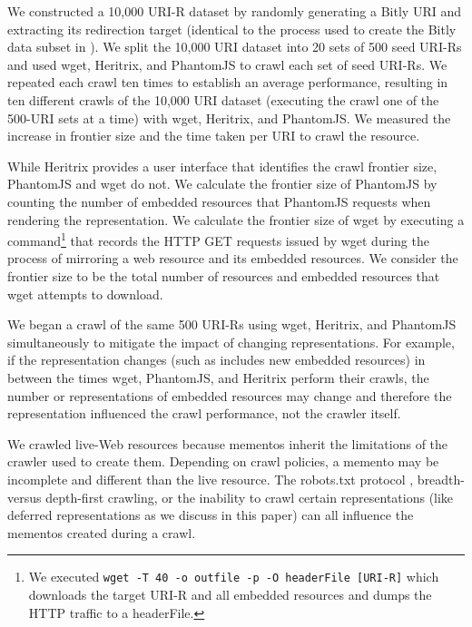 \documentclass{ipres_proc_article-sp}
\begin{document}
We constructed a 10,000 URI-R dataset by randomly generating a Bitly URI and extracting its redirection target (identical to the process used to create the Bitly data subset in \cite{hmotwia}). We split the 10,000 URI dataset into 20 sets of 500 seed URI-Rs and used wget, Heritrix, and PhantomJS to crawl each set of seed URI-Rs. We repeated each crawl ten times to establish an average performance, resulting in ten different crawls of the 10,000 URI dataset (executing the crawl one of the 500-URI sets at a time) with wget, Heritrix, and PhantomJS. We measured the increase in frontier size and the time taken per URI to crawl the resource. 

While Heritrix provides a user interface that identifies the crawl frontier size, PhantomJS and wget do not. We calculate the frontier size of PhantomJS by counting the number of embedded resources that PhantomJS requests when rendering the representation. We calculate the frontier size of wget by executing a command\footnote{We executed \texttt{wget -T 40 -o outfile -p -O headerFile [URI-R]} which downloads the target URI-R and all embedded resources and dumps the HTTP traffic to a headerFile.} that records the HTTP GET requests issued by wget during the process of mirroring a web resource and its embedded resources. We consider the frontier size to be the total number of resources and embedded resources that wget attempts to download.

We began a crawl of the same 500 URI-Rs using wget, Heritrix, and PhantomJS simultaneously to mitigate the impact of changing representations. For example, if the representation changes (such as includes new embedded resources) in between the times wget, PhantomJS, and Heritrix perform their crawls, the number or representations of embedded resources may change and therefore the representation influenced the crawl performance, not the crawler itself. 

We crawled live-Web resources because mementos inherit the limitations of the crawler used to create them. Depending on crawl policies, a memento may be incomplete and different than the live resource. The robots.txt protocol \cite{robots, robotsProtocol}, breadth- versus depth-first crawling, or the inability to crawl certain representations (like deferred representations as we discuss in this paper) can all influence the mementos created during a crawl.
\end{document}
